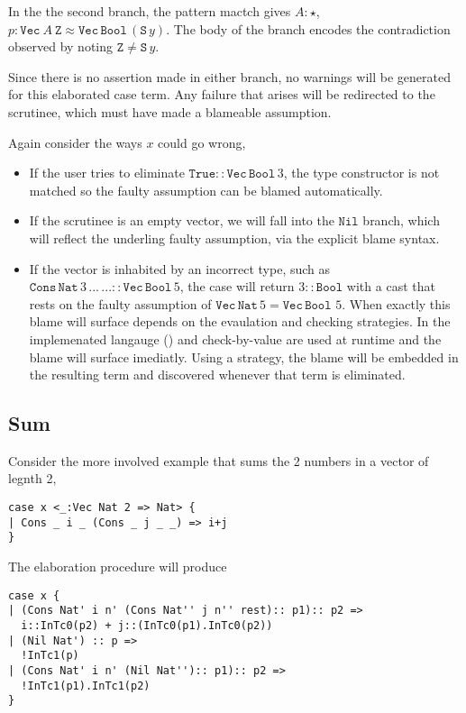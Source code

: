 In the the second branch, the pattern mactch gives $A:\star$, $p:\mathtt{Vec}\ A\ \mathtt{Z}\approx\mathtt{Vec}\,\mathtt{Bool}\,(\mathtt{S}\,y)$.
The body of the branch encodes the contradiction observed by noting $\mathtt{Z}\neq\mathtt{S}\,y$.

Since there is no assertion made in either branch, no warnings will be generated for this elaborated case term.
Any failure that arises will be redirected to the scrutinee, which must have made a blameable assumption.

Again consider the ways $x$ could go wrong,
\begin{itemize}
\item 
If the user tries to eliminate $\mathtt{True}::\mathtt{Vec}\,\mathtt{Bool}\,3$, the type constructor is not matched so the faulty assumption can be blamed automatically.
\item 
If the scrutinee is an empty vector, we will fall into the $\mathtt{Nil}$ branch, which will reflect the underling faulty assumption, via the explicit blame syntax.
\item
If the vector is inhabited by an incorrect type, such as $\mathtt{Cons}\,\mathtt{Nat}\,3\,...\,...::\mathtt{Vec}\,\mathtt{Bool}\,5$, the case will return $3::\mathtt{Bool}$ with a cast that rests on the faulty assumption of $\mathtt{Vec}\,\mathtt{Nat}\,5=\mathtt{Vec}\,\mathtt{Bool}\,\,5$.
When exactly this blame will surface depends on the evaulation and checking strategies.
In the implemenated langauge \cbv() and check-by-value are used at runtime and the blame will surface imediatly.
Using a \whnf{} strategy, the blame will be embedded in the resulting term and discovered whenever that term is eliminated.
\end{itemize}

\subsection{Sum}

Consider the more involved example that sums the 2 numbers in a vector of legnth 2,

\begin{lstlisting}[basicstyle={\ttfamily\small}]
case x <_:Vec Nat 2 => Nat> {
| Cons _ i _ (Cons _ j _ _) => i+j
}
\end{lstlisting}

The elaboration procedure will produce

\begin{lstlisting}[basicstyle={\ttfamily\small}]
case x {
| (Cons Nat' i n' (Cons Nat'' j n'' rest):: p1):: p2 => 
  i::InTc0(p2) + j::(InTc0(p1).InTc0(p2))
| (Nil Nat') :: p => 
  !InTc1(p)
| (Cons Nat' i n' (Nil Nat''):: p1):: p2 =>
  !InTc1(p1).InTc1(p2) 
}
\end{lstlisting}

